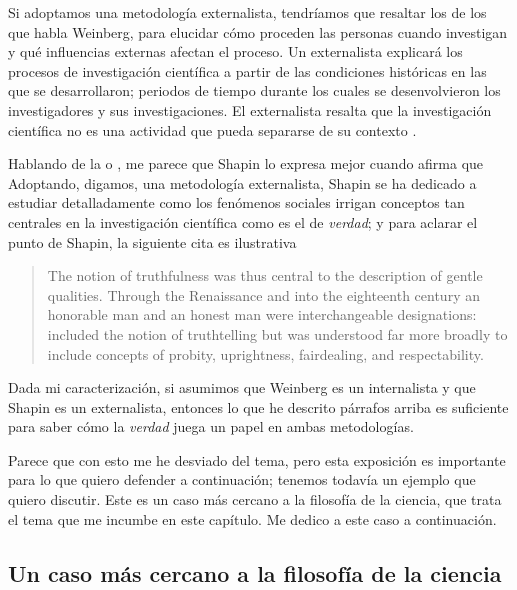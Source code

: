 Si adoptamos una metodología externalista, tendríamos que resaltar los  de los que habla Weinberg, para elucidar cómo proceden las personas cuando investigan y qué influencias externas afectan el proceso.
Un externalista explicará los procesos de investigación científica a partir de las condiciones históricas en las que se desarrollaron; periodos de tiempo durante los cuales se desenvolvieron los investigadores y sus investigaciones.
El externalista resalta que la investigación científica no es una actividad que pueda separarse de su contexto .

Hablando de la  o , me parece que Shapin lo expresa mejor cuando afirma que  \parencite[][Capítulo 2]{shapin2010never}
Adoptando, digamos, una metodología externalista, Shapin se ha dedicado a estudiar detalladamente como los fenómenos sociales irrigan conceptos tan centrales en la investigación científica como es el de \emph{verdad}; y para aclarar el punto de Shapin, la siguiente cita es ilustrativa

\begin{quote}
	The notion of truthfulness was thus central to the description of gentle qualities.
	Through the Renaissance and into the eighteenth century an honorable man and an honest man were interchangeable designations:  included the notion of truthtelling but was understood far more broadly to include concepts of probity, uprightness, fairdealing, and respectability. \parencite[][pp. 70-71]{Shapin1995}
\end{quote}

Dada mi caracterización, si asumimos que Weinberg es un internalista y que Shapin es un externalista, entonces lo que he descrito párrafos arriba es suficiente para saber cómo la \emph{verdad} juega un papel en ambas metodologías.

Parece que con esto me he desviado del tema, pero esta exposición es importante para lo que quiero defender a continuación; tenemos todavía un ejemplo que quiero discutir.
Este es un caso más cercano a la filosofía de la ciencia, que trata el tema que me incumbe en este capítulo.
Me dedico a este caso a continuación.

\subsection{Un caso más cercano a la filosofía de la ciencia}
\label{sbc:yturbe}


